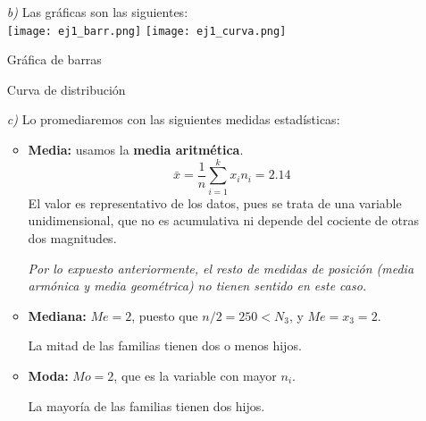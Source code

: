 \documentclass[11pt,a4paper]{article}
\theoremstyle{definition}
\begin{document}
\begin{itemize}
	\item[\emph{b)}] Las gráficas son las siguientes: \\

\hspace{0.5cm} \texttt{[image: ej1\_barr.png]} \hspace{0.5cm} \texttt{[image: ej1\_curva.png]}

\begin{multicols}{2}
\begin{center}
\small{Gráfica de barras} \\
\end{center}
\begin{center}
\small{Curva de distribución}
\end{center}
\end{multicols}

	\item[\emph{c)}] Lo promediaremos con las siguientes medidas estadísticas:
	\begin{itemize}
		\item \textbf{Media:} usamos la \textbf{media aritmética}. 
		$$ \bar{x} = \frac{1}{n} \sum_{i=1}^{k}x_{i}n_{i}= 2.14 $$
		El valor es representativo de los datos, pues se trata de una variable unidimensional, que no es acumulativa ni depende del cociente de otras dos magnitudes.
		\item[] \emph{Por lo expuesto anteriormente, el resto de medidas de posición (media armónica y media geométrica) no tienen sentido en este caso.}
		\item \textbf{Mediana: } $Me = 2$, puesto que $n/2=250 < N_3$, y $Me = x_3 = 2$.
		\item[] La mitad de las familias tienen dos o menos hijos.
		\item \textbf{Moda: } $Mo = 2$, que es la variable con mayor $n_i$.
		\item[] La mayoría de las familias tienen dos hijos.
	\end{itemize}
\end{itemize}




\pagebreak
\end{document}
